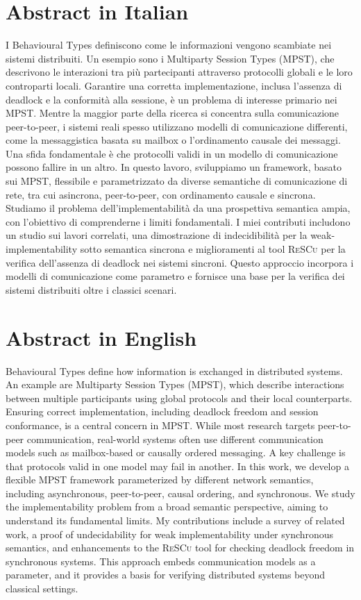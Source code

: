 \documentclass[12pt,a4paper,twoside]{book}
\theoremstyle{definition}
\theoremstyle{definition}
\theoremstyle{definition}
\begin{document}
\chapter*{Abstract in Italian}
I Behavioural Types definiscono come le informazioni vengono scambiate nei
sistemi distribuiti. Un esempio sono i Multiparty Session Types (MPST),
che descrivono le interazioni tra più partecipanti attraverso protocolli globali
e le loro controparti locali. Garantire una corretta implementazione, inclusa
l’assenza di deadlock e la conformità alla sessione, è un problema di interesse
primario nei MPST.  
Mentre la maggior parte della ricerca si concentra sulla comunicazione
peer-to-peer, i sistemi reali spesso utilizzano modelli di comunicazione
differenti, come la messaggistica basata su mailbox o l’ordinamento
causale dei messaggi. Una sfida fondamentale è che protocolli validi in un
modello di comunicazione possono fallire in un altro.  
In questo lavoro, sviluppiamo un framework, basato sui MPST,
flessibile e parametrizzato da diverse
semantiche di comunicazione di rete, tra cui asincrona, peer-to-peer, con ordinamento
causale e sincrona. Studiamo il problema dell’implementabilità da una
prospettiva semantica ampia, con l’obiettivo di comprenderne i limiti
fondamentali. I miei contributi includono un studio sui lavori correlati, una
dimostrazione di indecidibilità per la weak-implementability sotto semantica
sincrona e miglioramenti al tool \textsc{ReSCu} per la verifica
dell’assenza di deadlock nei sistemi sincroni.  
Questo approccio incorpora i modelli di comunicazione come parametro e fornisce
una base per la verifica dei sistemi distribuiti oltre i classici scenari. 
\thispagestyle{plain}
\topmargin=-1cm
\cleardoublepage

{}
\chapter*{Abstract in English}
Behavioural Types define how information is exchanged in distributed systems.
An example are Multiparty Session Types (MPST), which describe interactions between 
multiple participants
using global protocols and their local counterparts. Ensuring correct implementation,
including deadlock freedom and session conformance, is a central concern in MPST.
While most research targets peer-to-peer communication, real-world systems often
use different communication models such as mailbox-based or causally ordered messaging.
A key challenge is that protocols valid in one model may fail in another.
In this work, we develop a flexible MPST framework parameterized by different network
semantics, including asynchronous, peer-to-peer, causal ordering, and synchronous.
We study the implementability problem from a broad semantic perspective, aiming to
understand its fundamental limits. My contributions include a survey
of related work, a proof of undecidability for weak implementability under synchronous
semantics, and enhancements to the \textsc{ReSCu} tool for checking deadlock freedom in
synchronous systems. This approach embeds communication models as a parameter, and it
provides a basis for verifying distributed systems beyond classical settings.
\end{document}

